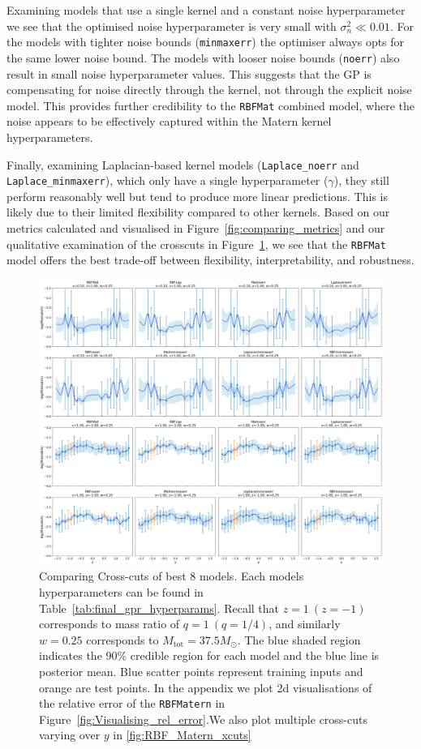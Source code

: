 \documentclass{ucdgradtaughtthesis}
\begin{document}
Examining models that use a single kernel and a constant noise hyperparameter we see that the optimised noise hyperparameter is very small with \(\sigma_n^2 \ll 0.01\). For the models with tighter noise bounds (\texttt{minmaxerr}) the optimiser always opts for the same lower noise bound. The models with looser noise bounds (\texttt{noerr})
also result in small noise hyperparameter values. This suggests that the GP is compensating for noise directly through the kernel, not through the explicit noise model. This provides further credibility to the \texttt{RBFMat} combined model, where the noise appears to be effectively captured within the Matern kernel hyperparameters.
%

Finally, examining Laplacian-based kernel models (\texttt{Laplace\_noerr} and \texttt{Laplace\_minmaxerr}), which only have a single hyperparameter ($\gamma$), they still perform reasonably well but tend to produce more linear predictions. This is likely due to their limited flexibility compared to other kernels.
Based on our metrics calculated and visualised in Figure~\ref{fig:comparing_metrics} and our qualitative examination of the crosscuts in Figure~\ref{fig:crosscuts_bestmodels}, we see that the \texttt{RBFMat} model offers the best trade-off between flexibility, interpretability, and robustness.
%
\begin{figure}[H]
    \centering
    \includegraphics[width=1\textwidth]{LatexPlots/final_gps_plots/gps_crosscuts_bestmodels.png}
    \caption[Comparing Cross-cuts of best 8 models.]{Comparing Cross-cuts of best 8 models. Each models hyperparameters can be found in Table~\ref{tab:final_gpr_hyperparams}. 
    Recall that $z=1\ (z=-1)$ corresponds to mass ratio of $q=1\ (q=1/4)$, and similarly $w=0.25$ corresponds to $M_\text{tot}=37.5M_\odot$. The blue shaded region indicates the 90\% credible region for each model
    and the blue line is posterior mean. Blue scatter points represent training inputs and orange are test points. In the appendix we plot 2d visualisations
    of the relative error of the \texttt{RBFMatern} in Figure~\ref{fig:Visualising_rel_error}.We also plot multiple cross-cuts varying over \(y\) in \ref{fig:RBF_Matern_xcuts}}
    \label{fig:crosscuts_bestmodels}
\end{figure}
\end{document}
